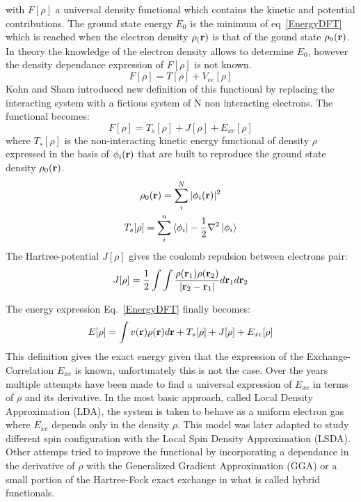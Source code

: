 \documentclass[12pt,a4paper]{report}
\numberwithin{equation}{section}
\begin{document}
with $F[\rho]$ a universal density functional which contains the kinetic and potential contributions.
The ground state energy $E_0$ is the minimum of eq~\ref{EnergyDFT} which is reached when the electron density $\rho_(\vb r)$ is that of the gound state $\rho_0(\vb r)$.
In theory the knowledge of the electron density allows to determine $E_0$, however the density dependance expression of $F[\rho]$ is not known.
\begin{equation}
    F[\rho]=T[\rho]+V_{ee}[\rho]
\end{equation}
Kohn and Sham introduced new definition of this functional\cite{kohn_self-consistent_1965} by replacing the interacting system with a fictious system of N non interacting electrons.%
The functional becomes:
\begin{equation}
    F[\rho]=T_s[\rho]+J[\rho]+E_{xc}[\rho]
\end{equation}
where $T_s[\rho]$ is the non-interacting kinetic energy functional of density $\rho$ expressed in the basis of $\phi_i (\vb r)$ that are built to reproduce the ground state density $\rho_0(\vb r)$.
\begin{gather}
    \rho_0(\vb r) = \sum_{i}^{N} |\phi_i (\vb r)|^2\\
    T_s[\rho]=\sum_{i}^{n} \bra{\phi_i} -\frac{1}{2}\nabla^2 \ket{\phi_i}
\end{gather}
The Hartree-potential $J[\rho]$ gives the coulomb repulsion between electrons pair:
\begin{equation}
    J[\rho]=\frac{1}{2}\int\int \frac{\rho(\vb r_1) \rho(\vb r_2)}{|\vb r_2 - \vb r_1 |} d\vb r_1 d\vb r_2
\end{equation}

The energy expression Eq.~\ref{EnergyDFT} finally becomes:
\begin{equation}
    E[\rho]= \int v(\vb r) \rho(\vb r) d\vb r + T_s[\rho] + J[\rho]+ E_{xc}[\rho]
\end{equation}
This definition gives the exact energy given that the expression of the Exchange-Correlation $E_{xc}$ is known, unfortunately this is not the case. 
Over the years multiple attempts have been made to find a universal expression of $E_{xc}$ in terms of $\rho$ and its derivative. 
In the most basic approach, called Local Density Approximation (LDA), the system is taken to behave as a uniform electron gas where $E_{xc}$ depends only in the density $\rho$. 
This model was later adapted to study different spin configuration with the Local Spin Density Approximation (LSDA).
Other attemps tried to improve the functional by incorporating a dependance in the derivative of $\rho$ with the Generalized Gradient Approximation (GGA) or a small portion of the Hartree-Fock exact exchange in what is called hybrid functionals.
\end{document}
